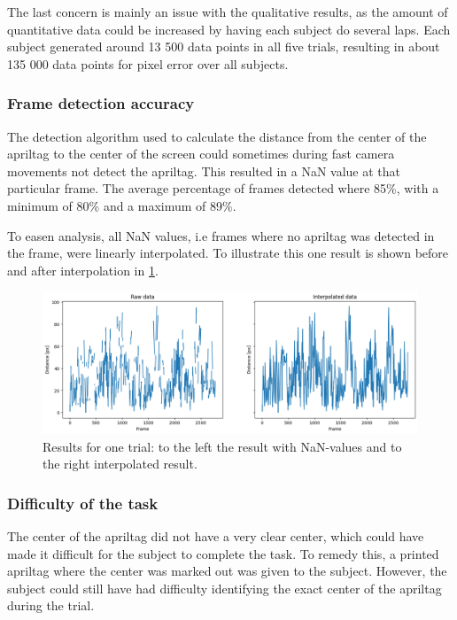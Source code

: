 \documentclass[nofilelist]{cslthse-msc}
\begin{document}
The last concern is mainly an issue with the qualitative results, as the amount of quantitative data could be increased by having each subject do several laps. Each subject generated around 13 500 data points in all five trials, resulting in about 135 000 data points for pixel error over all subjects.

\subsubsection{Frame detection accuracy}
The detection algorithm used to calculate the distance from the center of the apriltag to the center of the screen could sometimes during fast camera movements not detect the apriltag. This resulted in a NaN value at that particular frame. The average percentage of frames detected where 85\%, with a minimum of 80\% and a maximum of 89\%.

To easen analysis, all NaN values, i.e frames where no apriltag was detected in the frame, were linearly interpolated. To illustrate this one result is shown before and after interpolation in \ref{fig:raw-vs-interpolated}. 

\begin{figure}[!hbt]
   \centering
   \includegraphics[scale=0.5]{images/raw-vs-interpolated.png} 
   \caption{Results for one trial: to the left the result with NaN-values and to the right interpolated result.}
   \label{fig:raw-vs-interpolated}
\end{figure}

\subsubsection{Difficulty of the task}
The center of the apriltag did not have a very clear center, which could have made it difficult for the subject to complete the task. To remedy this, a printed apriltag where the center was marked out was given to the subject. However, the subject could still have had difficulty identifying the exact center of the apriltag during the trial.
\end{document}
